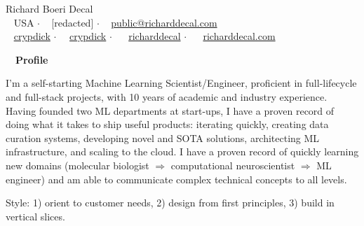 \documentclass[a4paper,12pt]{article}
\newcommand{\resheading}[1]{{\hspace{-9pt} \colorbox{mygrey}{\begin{minipage}{\textwidth}{\textmd{~~\large \textbf{#1} \vphantom{p\^{E}}}}\end{minipage}}\vspace{6pt}} }
\begin{document}
    \begin{center}
    {\Huge Richard Boeri Decal}
        \\
        {\small \faMapMarker~ USA $\cdot$ \faPhone~ [redacted] $\cdot$ \faEnvelope~ \href{mailto:public@richarddecal.com}{public@richarddecal.com}  \\ \faGithubAlt~ \href{https://github.com/crypdick}{crypdick} $\cdot$~\faStackOverflow~  \href{https://stackoverflow.com/users/4212158/crypdick}{crypdick} $\cdot$ ~\faLinkedin~ \href{https://www.linkedin.com/in/richarddecal/}{richarddecal}  $\cdot$ ~\faHome~  \href{https://www.richarddecal.com}{richarddecal.com}}
    \end{center}

    \resheading{Profile}

    I'm a self-starting Machine Learning Scientist/Engineer, proficient in full-lifecycle and 
    full-stack projects, with 10 years of academic and industry experience.
    Having founded two ML departments at start-ups, I have a proven record of doing what 
    it takes to ship useful products: iterating quickly, creating data curation systems, developing 
    novel and SOTA solutions, architecting ML infrastructure, and scaling to the cloud. 
    I have a proven record of quickly learning new domains (molecular biologist $\Rightarrow$ computational neuroscientist $\Rightarrow$ ML engineer) and am able to communicate complex technical concepts to all levels.

    \vspace{0.5em} %

    Style: 1) orient to customer needs, 2) design from first principles, 3) build in vertical slices.\\


%
\end{document}
